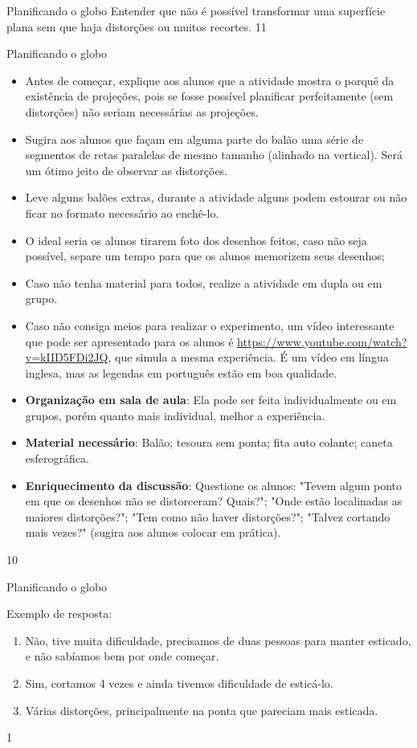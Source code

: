 \begin{ObjetivoEsp}{Planificando o globo}
{
  Entender que não é possível transformar uma superfície plana sem que haja distorções ou muitos recortes.
}{1}{1}
\end{ObjetivoEsp}
\clearmargin
\begin{Recomenda}{Planificando o globo}
{
  \begin{itemize}
  \item Antes de começar, explique aos alunos que a atividade mostra o porquê da existência de projeções, pois se fosse possível planificar perfeitamente (sem distorções) não seriam necessárias as projeções.
  \item Sugira aos alunos que façam em alguma parte do balão uma série de segmentos de retas paralelas de mesmo tamanho (alinhado na vertical). Será um ótimo jeito de observar as distorções.
  \item Leve alguns balões extras, durante a atividade alguns podem estourar ou não ficar no formato necessário ao enchê-lo.
  \item O ideal seria os alunos tirarem foto dos desenhos feitos, caso não seja possível, separe um tempo para que os alunos memorizem seus desenhos;
  \item Caso não tenha material para todos, realize a atividade em dupla ou em grupo.
  \item Caso não consiga meios para realizar o experimento, um vídeo interessante que pode ser apresentado para os alunos é \url{https://www.youtube.com/watch?v=kIID5FDi2JQ}, que simula a mesma experiência. É um vídeo em língua inglesa, mas as legendas em português estão em boa qualidade.
  \item \textbf{Organização em sala de aula}: Ela pode ser feita individualmente ou em grupos, porém quanto mais individual, melhor a experiência.
  \item \textbf{Material necessário}: Balão; tesoura sem ponta; fita auto colante; caneta esferográfica.
  \item\textbf{Enriquecimento da discussão}: Questione os alunos: "Tevem algum ponto em que os desenhos não se distorceram? Quais?"; "Onde estão localinadas as maiores distorções?"; "Tem como não haver distorções?"; "Talvez cortando mais vezes?" (sugira aos alunos colocar em prática).
  \end{itemize}
}{1}{0}
\end{Recomenda}
\begin{resposta}{Planificando o globo}
{
  Exemplo de resposta:
  \begin{enumerate}
  \item Não, tive muita dificuldade, precisamos de duas pessoas para manter esticado, e não sabíamos bem por onde começar.
  \item Sim, cortamos 4 vezes e ainda tivemos dificuldade de esticá-lo.
  \item Várias distorções, principalmente na ponta que pareciam mais esticada.
  \end{enumerate}
}{1}
\end{resposta}

